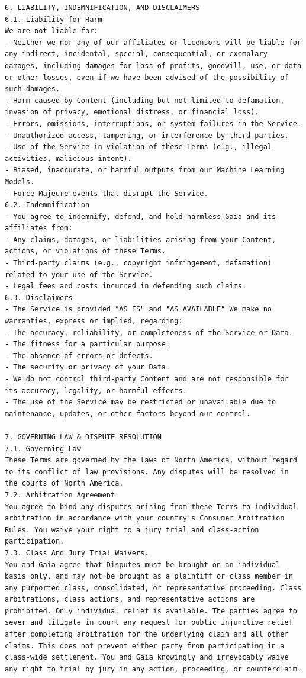 \documentclass[manuscript,review,anonymous]{acmart}
\begin{document}
\begin{lstlisting}[frame=single,upquote=false,breaklines=true,columns=fullflexible,columns=fullflexible,columns=fullflexible,breakindent=0pt,basicstyle=\ttfamily\small]
6. LIABILITY, INDEMNIFICATION, AND DISCLAIMERS
6.1. Liability for Harm
We are not liable for:
- Neither we nor any of our affiliates or licensors will be liable for any indirect, incidental, special, consequential, or exemplary damages, including damages for loss of profits, goodwill, use, or data or other losses, even if we have been advised of the possibility of such damages.
- Harm caused by Content (including but not limited to defamation, invasion of privacy, emotional distress, or financial loss).
- Errors, omissions, interruptions, or system failures in the Service.
- Unauthorized access, tampering, or interference by third parties.
- Use of the Service in violation of these Terms (e.g., illegal activities, malicious intent).
- Biased, inaccurate, or harmful outputs from our Machine Learning Models.
- Force Majeure events that disrupt the Service.
6.2. Indemnification
- You agree to indemnify, defend, and hold harmless Gaia and its affiliates from:
- Any claims, damages, or liabilities arising from your Content, actions, or violations of these Terms.
- Third-party claims (e.g., copyright infringement, defamation) related to your use of the Service.
- Legal fees and costs incurred in defending such claims.
6.3. Disclaimers
- The Service is provided "AS IS" and "AS AVAILABLE" We make no warranties, express or implied, regarding:
- The accuracy, reliability, or completeness of the Service or Data.
- The fitness for a particular purpose.
- The absence of errors or defects.
- The security or privacy of your Data.
- We do not control third-party Content and are not responsible for its accuracy, legality, or harmful effects.
- The use of the Service may be restricted or unavailable due to maintenance, updates, or other factors beyond our control.

7. GOVERNING LAW & DISPUTE RESOLUTION
7.1. Governing Law
These Terms are governed by the laws of North America, without regard to its conflict of law provisions. Any disputes will be resolved in the courts of North America.
7.2. Arbitration Agreement
You agree to bind any disputes arising from these Terms to individual arbitration in accordance with your country's Consumer Arbitration Rules. You waive your right to a jury trial and class-action participation.
7.3. Class And Jury Trial Waivers.
You and Gaia agree that Disputes must be brought on an individual basis only, and may not be brought as a plaintiff or class member in any purported class, consolidated, or representative proceeding. Class arbitrations, class actions, and representative actions are prohibited. Only individual relief is available. The parties agree to sever and litigate in court any request for public injunctive relief after completing arbitration for the underlying claim and all other claims. This does not prevent either party from participating in a class-wide settlement. You and Gaia knowingly and irrevocably waive any right to trial by jury in any action, proceeding, or counterclaim.


\end{lstlisting}
\end{document}
